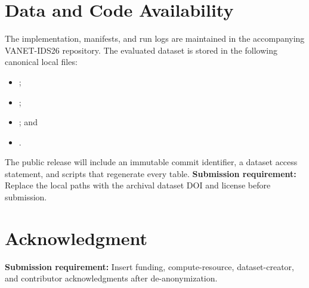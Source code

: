 \documentclass[journal]{IEEEtran}
\newcommand{\revisionnote}[1]{\textcolor{red!70!black}{\textbf{Submission requirement:} #1}}
\begin{document}
\section*{Data and Code Availability}
The implementation, manifests, and run logs are maintained in the accompanying VANET-IDS26 repository. The evaluated dataset is stored in the following canonical local files:
\begin{itemize}
    \item {};
    \item {};
    \item {}; and
    \item {}.
\end{itemize}
The public release will include an immutable commit identifier, a dataset access statement, and scripts that regenerate every table. \revisionnote{Replace the local paths with the archival dataset DOI and license before submission.}

\section*{Acknowledgment}
\revisionnote{Insert funding, compute-resource, dataset-creator, and contributor acknowledgments after de-anonymization.}



\end{document}
